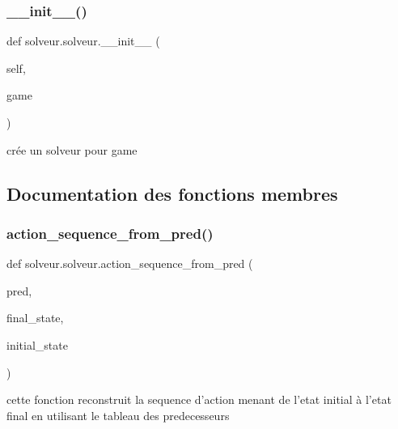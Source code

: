 \subsubsection{\texorpdfstring{\+\_\+\+\_\+init\+\_\+\+\_\+()}{\_\_init\_\_()}}
{\footnotesize\ttfamily def solveur.\+solveur.\+\_\+\+\_\+init\+\_\+\+\_\+ (\begin{DoxyParamCaption}\item[{}]{self,  }\item[{}]{game }\end{DoxyParamCaption})}

\begin{DoxyVerb}crée un solveur pour game \end{DoxyVerb}
 

\subsection{Documentation des fonctions membres}
\mbox{\label{classsolveur_1_1solveur_af3ccbdb13bf858ee950da16f2d736d52}} 
\subsubsection{\texorpdfstring{action\+\_\+sequence\+\_\+from\+\_\+pred()}{action\_sequence\_from\_pred()}}
{\footnotesize\ttfamily def solveur.\+solveur.\+action\+\_\+sequence\+\_\+from\+\_\+pred (\begin{DoxyParamCaption}\item[{}]{pred,  }\item[{}]{final\+\_\+state,  }\item[{}]{initial\+\_\+state }\end{DoxyParamCaption})\hspace{0.3cm}{\ttfamily [static]}}

\begin{DoxyVerb}cette fonction reconstruit la sequence d'action menant de l'etat initial à l'etat final
en utilisant le tableau des predecesseurs
\end{DoxyVerb}
 \mbox{\label{classsolveur_1_1solveur_aae96bc7e6e7b11a51d4a55564414ba92}} 
